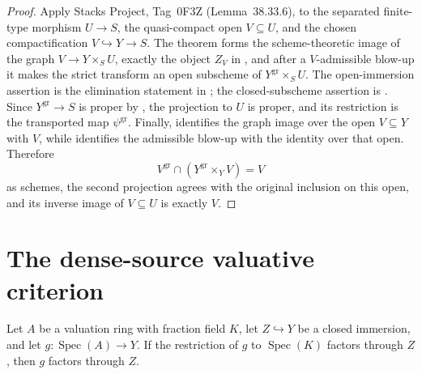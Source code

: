 \begin{proof}
  \leanok
  Apply Stacks Project, Tag~0F3Z (Lemma~38.33.6), to the separated
  finite-type morphism $U\to S$, the quasi-compact open $V\subseteq U$, and
  the chosen compactification $V\hookrightarrow Y\to S$.  The theorem forms
  the scheme-theoretic image of the graph
  $V\to Y\times_SU$, exactly the object $Z_V$ in
  , and after a $V$-admissible blow-up it
  makes the strict transform an open subscheme of
  $Y^{\mathrm{gr}}\times_SU$.  The open-immersion assertion is the
  elimination statement in
  ; the closed-subscheme
  assertion is
  .  Since
  $Y^{\mathrm{gr}}\to S$ is proper by
  , the projection to $U$ is proper,
  and its restriction is the transported map $\psi^{\mathrm{gr}}$.
  Finally,
   identifies the graph
  image over the open $V\subseteq Y$ with $V$, while
   identifies the
  admissible blow-up with the identity over that open.  Therefore
  \[
    V^{\mathrm{gr}}\cap
    (Y^{\mathrm{gr}}\times_YV)=V
  \]
  as schemes, the second projection agrees with the original inclusion on
  this open, and its inverse image of $V\subseteq U$ is exactly $V$.
\end{proof}


\section{The dense-source valuative criterion}

\begin{lemma}
  \label{lemma:nagata-valuation-factor-closed}
  \leanok

  Let $A$ be a valuation ring with fraction field $K$, let $Z\hookrightarrow Y$
  be a closed immersion, and let $g\colon\operatorname{Spec}(A)\to Y$.  If the
  restriction of $g$ to $\operatorname{Spec}(K)$ factors through $Z$, then
  $g$ factors through $Z$.
\end{lemma}

